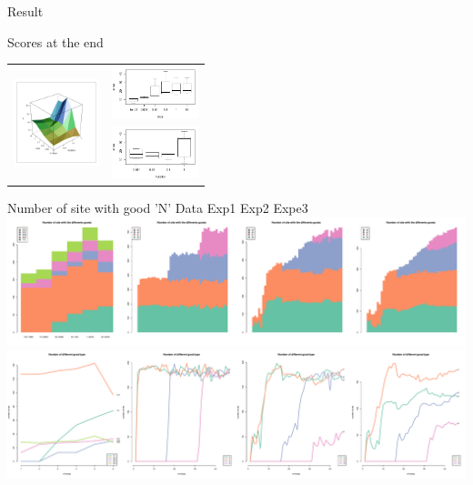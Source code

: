 \documentclass[12pt, notes=show]{beamer}
\begin{document}
\begin{frame}{Result}
    \vspace{-1.5cm}

    \begin{table}

     \tiny Scores at the end
	\begin{tabular}{c m{2.5cm}}
	   \multirow{2}{2.5cm}{\includegraphics[height=2.5cm]{../images/ScoreMuCopyAll.pdf}} &
	   \vspace{1cm}\includegraphics[height=1.5cm]{../images/ScoreCopyAll.pdf}\\
	    & \includegraphics[height=1.5cm]{../images/ScoreMuAll.pdf} \\
	\end{tabular}
    \end{table}
\end{frame}

\begin{frame}{Number of site with good 'N'}
    \small
Data \hfill Exp1 \hfill Exp2 \hfill Expe3 
	\includegraphics[width=\textwidth]{../images/hmNbSiteWGoodN.pdf}\\
	\includegraphics[width=\textwidth]{../images/plotNbSiteWGoodN.pdf}\\
\end{frame}
\end{document}
